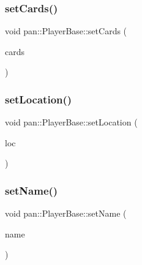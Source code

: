 \mbox{\label{classpan_1_1_player_base_a94e33fc8f12381165320363b2886b7f6}} 
\subsubsection{\texorpdfstring{set\+Cards()}{setCards()}}
{\footnotesize\ttfamily void pan\+::\+Player\+Base\+::set\+Cards (\begin{DoxyParamCaption}\item[{const \hyperlink{classpan_1_1detail_1_1_deck}{detail\+::\+Deck}$<$ std\+::shared\+\_\+ptr$<$ \hyperlink{classpan_1_1_card_base}{Card\+Base} $>$$>$ \&}]{cards }\end{DoxyParamCaption})\hspace{0.3cm}{\ttfamily [inline]}}

\mbox{\label{classpan_1_1_player_base_ad124348adae23b1d6b85fe1359b7c752}} 
\subsubsection{\texorpdfstring{set\+Location()}{setLocation()}}
{\footnotesize\ttfamily void pan\+::\+Player\+Base\+::set\+Location (\begin{DoxyParamCaption}\item[{\hyperlink{namespacepan_afaed28aa6603153dcc062a028602d697}{City\+Index}}]{loc }\end{DoxyParamCaption})\hspace{0.3cm}{\ttfamily [inline]}}

\mbox{\label{classpan_1_1_player_base_a7c8cf80013d7ffa5139a33e3a5d8d395}} 
\subsubsection{\texorpdfstring{set\+Name()}{setName()}}
{\footnotesize\ttfamily void pan\+::\+Player\+Base\+::set\+Name (\begin{DoxyParamCaption}\item[{const std\+::string \&}]{name }\end{DoxyParamCaption})\hspace{0.3cm}{\ttfamily [inline]}}



